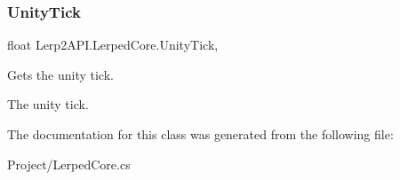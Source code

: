 \subsubsection{\texorpdfstring{Unity\+Tick}{UnityTick}}
{\footnotesize\ttfamily float Lerp2\+A\+P\+I.\+Lerped\+Core.\+Unity\+Tick\hspace{0.3cm}{\ttfamily [static]}, {\ttfamily [get]}}



Gets the unity tick. 

The unity tick.

The documentation for this class was generated from the following file\+:\begin{DoxyCompactItemize}
\item 
Project/Lerped\+Core.\+cs\end{DoxyCompactItemize}

